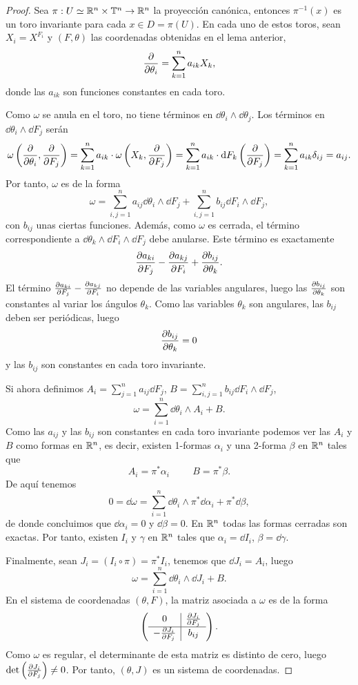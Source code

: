 \begin{proof}
  Sea $\pi:U\simeq \mathbb{R}^n \times \mathbb{T}^n \rightarrow \mathbb{R}^n$ la proyección canónica, entonces $\pi^{-1}(x)$ es un toro invariante para cada $x \in D=\pi(U)$. En cada uno de estos toros, sean $X_i=X^{F_i}$ y $(F,\theta)$ las coordenadas obtenidas en el lema anterior,
\[
  \frac{\partial}{\partial \theta_i} = \sum_{k=1}^n a_{ik}X_k,
\]
donde las $a_{ik}$ son funciones constantes en cada toro.

Como $\omega$ se anula en el toro, no tiene términos en $\dd \theta_i \wedge \dd \theta_j$. Los términos en $\dd \theta_i \wedge \dd F_j$ serán
\[
  \omega\left(\frac{\partial}{\partial \theta_i},\frac{\partial}{\partial F_j}\right)=\sum_{k=1}^n a_{ik}\cdot \omega\left(X_k,\frac{\partial}{\partial F_j}\right)=\sum_{k=1}^n a_{ik} \cdot \mathrm{d} F_k \left(\frac{\partial}{\partial F_j}\right) = \sum_{k=1}^n a_{ik} \delta_{ij}= a_{ij}. 
\]
Por tanto, $\omega$ es de la forma
\[
  \omega = \sum_{i,j=1}^n a_{ij} \dd \theta_i \wedge \dd F_j + \sum_{i,j=1}^n b_{ij} \dd F_i \wedge \dd F_j,
\]
con $b_{ij}$ unas ciertas funciones. Además, como $\omega$ es cerrada, el término correspondiente a $\dd \theta_k \wedge \dd F_i \wedge \dd F_j$ debe anularse. Este término es exactamente
\[
  \frac{\partial a_{ki}}{\partial F_j}-\frac{\partial a_{kj}}{\partial F_i}+\frac{\partial b_{ij}}{\partial \theta_k}.
\]
El término $\frac{\partial a_{ki}}{\partial F_j}-\frac{\partial a_{kj}}{\partial F_i}$ no depende de las variables angulares, luego las $\frac{\partial b_{ij}}{\partial \theta_k}$ son constantes al variar los ángulos $\theta_k$. Como las variables $\theta_k$ son angulares, las $b_{ij}$ deben ser periódicas, luego
\[
  \frac{\partial b_{ij}}{\partial \theta_k}=0
\]
y las $b_{ij}$ son constantes en cada toro invariante.

Si ahora definimos $A_i=\sum_{j=1}^n a_{ij}\dd F_j$, $B=\sum_{i,j=1}^n b_{ij}\dd F_i \wedge \dd F_j$,
\[
  \omega=\sum_{i=1}^n \dd \theta_i \wedge A_i + B.
\]
Como las $a_{ij}$ y las $b_{ij}$ son constantes en cada toro invariante podemos ver las $A_i$ y $B$ como formas en $\mathbb{R}^n$, es decir, existen 1-formas $\alpha_i$ y una 2-forma $\beta$ en $\mathbb{R}^n$ tales que
\[
  A_i= \pi^* \alpha_i \hspace{1cm} B=\pi^* \beta.
\]
De aquí tenemos
\[
  0=\dd \omega= \sum_{i=1}^n \dd \theta_i \wedge \pi^* \dd \alpha_i + \pi^* \dd \beta,
\]
de donde concluimos que $\dd \alpha_i = 0$ y $\dd \beta =0$. En $\mathbb{R}^n$ todas las formas cerradas son exactas. Por tanto, existen $I_i$ y $\gamma$ en $\mathbb{R}^n$ tales que $\alpha_i = \dd I_i$, $\beta= \dd \gamma$.

Finalmente, sean $J_i=(I_i \circ \pi)=\pi^* I_i$, tenemos que $\dd J_i = A_i$, luego
\[
  \omega = \sum_{i=1}^n \dd \theta_i \wedge \dd J_i + B.
\]
En el sistema de coordenadas $(\theta,F)$, la matriz asociada a $\omega$ es de la forma
\[
\left(
\begin{array}{c|c}
  0 & \frac{\partial J_i}{\partial F_j} \\
  \hline 
  -\frac{\partial J_i}{\partial F_j} & b_{ij}
\end{array}\right).
\]
Como $\omega$ es regular, el determinante de esta matriz es distinto de cero, luego $\det\left(\frac{\partial J_i}{\partial F_j}\right)\neq 0$. Por tanto, $(\theta,J)$ es un sistema de coordenadas.


\end{proof}
